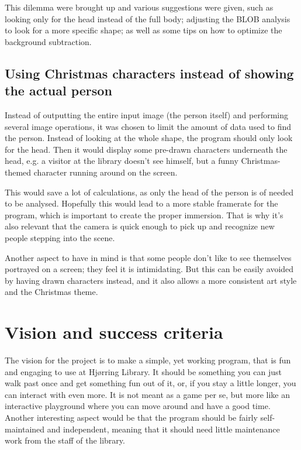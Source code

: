 This dilemma were brought up and various suggestions were given, such as looking only for the head instead of the full body; adjusting the BLOB analysis to look for a more specific shape; as well as some tips on how to optimize the background subtraction.


\subsection{Using Christmas characters instead of showing the actual person}
Instead of outputting the entire input image (the person itself) and performing several image operations, it was chosen to limit the amount of data used to find the person. Instead of looking at the whole shape, the program should only look for the head. Then it would display some pre-drawn characters underneath the head, e.g. a visitor at the library doesn't see himself, but a funny Christmas-themed character running around on the screen.

This would save a lot of calculations, as only the head of the person is of needed to be analysed. Hopefully this would lead to a more stable framerate for the program, which is important to create the proper immersion. That is why it's also relevant that the camera is quick enough to pick up and recognize new people stepping into the scene.

Another aspect to have in mind is that some people don't like to see themselves portrayed on a screen; they feel it is intimidating. But this can be easily avoided by having drawn characters instead, and it also allows a more consistent art style and the Christmas theme.
  
\section{Vision and success criteria}
The vision for the project is to make a simple, yet working program, that is fun and engaging to use at Hj{\o}rring Library. It should be something you can just walk past once and get something fun out of it, or, if you stay a little longer, you can interact with even more. It is not meant as a game per se, but more like an interactive playground where you can move around and have a good time. Another interesting aspect would be that the program should be fairly self-maintained and independent, meaning that it should need little maintenance work from the staff of the library.

